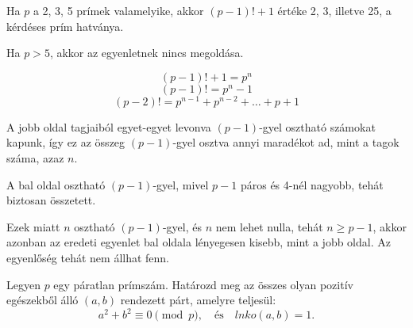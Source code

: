 \begin{solution}
Ha $p$ a 2, 3, 5 prímek valamelyike, akkor $(p-1)!+1$ értéke 2,
3, illetve 25, a kérdéses prím hatványa.

Ha $p>5$, akkor az egyenletnek nincs megoldása.

\[
(p-1)!+1=p^{n}
\]
\[
(p-1)!=p^{n}-1
\]
\[
(p-2)!=p^{n-1}+p^{n-2}+\ldots+p+1
\]

A jobb oldal tagjaiból egyet-egyet levonva $(p-1)$-gyel osztható
számokat kapunk, így ez az összeg $(p-1)$-gyel osztva annyi maradékot
ad, mint a tagok száma, azaz $n$.

A bal oldal osztható $(p-1)$-gyel, mivel $p-1$ páros és 4-nél nagyobb,
tehát biztosan összetett.

Ezek miatt $n$ osztható $(p-1)$-gyel, és $n$ nem lehet nulla, tehát
$n\geq p-1$, akkor azonban az eredeti egyenlet bal oldala lényegesen
kisebb, mint a jobb oldal. Az egyenlőség tehát nem állhat fenn.
\end{solution}
\begin{extraproblem}
Legyen $p$ egy páratlan prímszám. Határozd meg az összes olyan pozitív
egészekből álló $(a,b)$ rendezett párt, amelyre teljesül: 
\[
a^{2}+b^{2}\equiv0\pmod p,\quad\text{és}\quad lnko(a,b)=1.
\]
\end{extraproblem}

